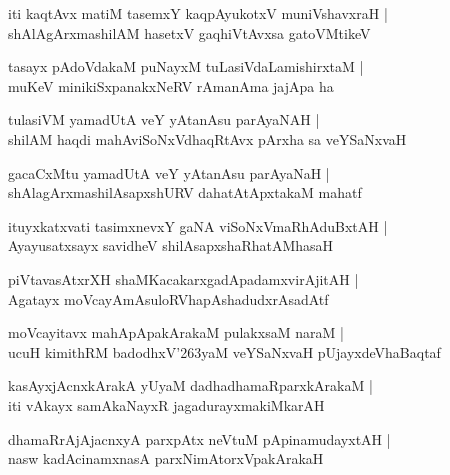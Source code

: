 \documentclass[twoside,12pt,openright]{book}
\def\S{\char'263}
\newcounter{shloka}[chapter]
\begin{document}
\begin{shloka}%
iti kaqtAvx matiM tasemxY kaqpAyukotxV muniVshavxraH |\\
shAlAgArxmashilAM hasetxV gaqhiVtAvxsa gatoVMtikeV 
\end{shloka}

\begin{shloka}%
tasayx pAdoVdakaM puNayxM tuLasiVdaLamishirxtaM |\\
muKeV minikiSxpanakxNeRV rAmanAma jajApa ha 
\end{shloka}

\begin{shloka}%
tulasiVM yamadUtA veY yAtanAsu parAyaNAH |\\
shilAM haqdi mahAviSoNxVdhaqRtAvx pArxha sa veYSaNxvaH
\end{shloka}

\begin{shloka}%
gacaCxMtu yamadUtA veY yAtanAsu parAyaNaH |\\
shAlagArxmashilAsapxshURV dahatAtApxtakaM mahatf
\end{shloka}

\begin{shloka}%
ituyxkatxvati tasimxnevxY gaNA viSoNxVmaRhAduBxtAH |\\
Ayayusatxsayx savidheV shilAsapxshaRhatAMhasaH 
\end{shloka}

\begin{shloka}%
piVtavasAtxrXH shaMKacakarxgadApadamxvirAjitAH |\\
Agatayx moVcayAmAsuloRVhapAshadudxrAsadAtf 
\end{shloka}

\begin{shloka}%
moVcayitavx mahApApakArakaM pulakxsaM naraM |\\
ucuH kimithRM badodhxV\S yaM veYSaNxvaH pUjayxdeVhaBaqtaf 
\end{shloka}

\begin{shloka}%
kasAyxjAcnxkArakA yUyaM dadhadhamaRparxkArakaM |\\
iti vAkayx samAkaNayxR jagadurayxmakiMkarAH  
\end{shloka}

\begin{shloka}%
dhamaRrAjAjacnxyA parxpAtx neVtuM pApinamudayxtAH |\\
nasw kadAcinamxnasA parxNimAtorxVpakArakaH 
\end{shloka}
\end{document}
